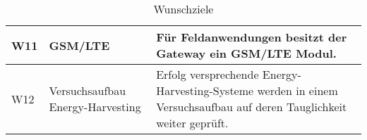 \begin{table}[H]
\begin{tabular}{ | C{0.9cm} | p{3.3cm} | p{10cm} |}
W11 & GSM/LTE & Für Feldanwendungen besitzt der Gateway ein GSM/LTE Modul. \\ \hline

W12 & Versuchsaufbau Energy-Harvesting & Erfolg versprechende Energy-Harvesting-Systeme werden in einem Versuchsaufbau auf deren Tauglichkeit weiter geprüft. \\ \hline


\end{tabular}\\
\caption{Wunschziele}
\label{tab:Wunschziele}
\end{table}

















